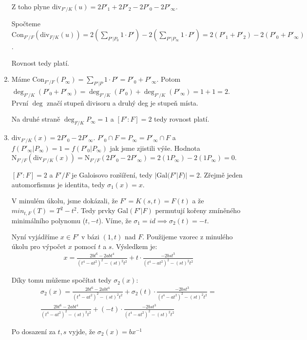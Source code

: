 \documentclass[12pt, a4paper]{article}
\begin{document}
\begin{enumerate}[label=(\alph*)]
    Z toho plyne $\text{div}_{F'/K}(u) = 2P'_1 + 2P'_2 - 2P'_0 - 2P'_\infty$.

    Spočteme $\text{Con}_{F'/F}(\text{div}_{F/K}(u)) = 2(\sum\limits_{P'|P_0}1\cdot P') -2(\sum\limits_{P'|P_\infty}1\cdot P') = 2(P'_1+P'_2)-2(P'_0+P'_\infty)$.

    Rovnost tedy platí.

    \item Máme $\text{Con}_{F'/F}(P_\infty) = \sum\limits_{P'|P}1\cdot P' = P'_0 + P'_\infty$. Potom $\deg_{F'/K}(P'_0+P'_\infty) = \deg_{F'/K}(P'_0) + \deg_{F'/K}(P'_\infty) = 1+1=2$. První $\deg$ značí stupeň divisoru a druhý deg je stupeň místa.

    Na druhé straně $\deg_{F/K}{P_\infty} = 1$ a $[F':F] = 2$ tedy rovnost platí.

    \item $\text{div}_{F'/K}(x) = 2P'_0 - 2P'_\infty$. $P'_0 \cap F = P_\infty = P'_\infty \cap F$ a $f(P'_\infty|P_\infty)=1=f(P'_0|P_\infty)$ jak jsme zjistili výše. Hodnota $\text{N}_{F'/F}(\text{div}_{F'/K}(x)) = \text{N}_{F'/F}(2P'_0 - 2P'_\infty) = 2(1P_\infty)-2(1P_\infty) = 0$.

    $[F':F]=2$ a $F'/F$ je Galoisovo rozšíření, tedy $|\text{Gal}(F'|F)|=2$. Zřejmě jeden automorfismus je identita, tedy $\sigma_1(x)=x$. 

    V minulém úkolu, jsme dokázali, že $F'=K(s,t) = F(t)$ a že $min_{t,F}(T)=T^2-t^2$. Tedy prvky $\text{Gal}(F'|F)$ permutují kořeny zmíněného minimálního polynomu ($t, -t$). Víme, že $\sigma_1 = id \implies \sigma_2(t) = -t$.

    Nyní vyjádříme $x \in F'$ v bázi $(1,t)$ nad $F$. Použijeme vzorec z minulého úkolu pro výpočet $x$ pomocí $t$ a $s$. Výsledkem je:
    \begin{gather*}
    x = \frac{2bt^6-2abt^4}{(t^4-at^2)^2-(st)^2t^2} + t \cdot \frac{-2bst^3}{(t^4-at^2)^2-(st)^2t^2}
    \end{gather*}

    Díky tomu můžeme spočítat tedy $\sigma_2(x)$:
    \begin{gather*}
    \sigma_2(x) = \frac{2bt^6-2abt^4}{(t^4-at^2)^2-(st)^2t^2} + \sigma_2(t) \cdot \frac{-2bst^3}{(t^4-at^2)^2-(st)^2t^2} = \\
    \frac{2bt^6-2abt^4}{(t^4-at^2)^2-(st)^2t^2} + (-t) \cdot \frac{-2bst^3}{(t^4-at^2)^2-(st)^2t^2}
    \end{gather*}

    Po dosazení za $t,s$ vyjde, že $\sigma_2(x)=bx^{-1}$


\end{enumerate}
\end{document}
